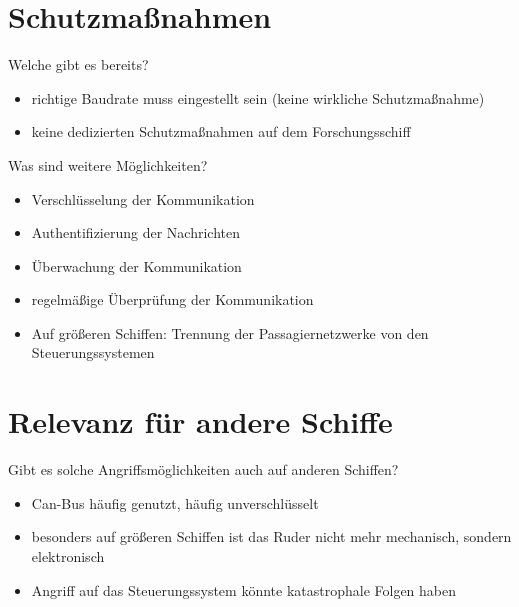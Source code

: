 \section{Schutzmaßnahmen}
Welche gibt es bereits?
\begin{itemize}
    \item richtige Baudrate muss eingestellt sein (keine wirkliche Schutzmaßnahme)
    \item keine dedizierten Schutzmaßnahmen auf dem Forschungsschiff
\end{itemize}
Was sind weitere Möglichkeiten?
\begin{itemize}
    \item Verschlüsselung der Kommunikation
    \item Authentifizierung der Nachrichten
    \item Überwachung der Kommunikation
    \item regelmäßige Überprüfung der Kommunikation
    \item Auf größeren Schiffen: Trennung der Passagiernetzwerke von den Steuerungssystemen
\end{itemize}

\section{Relevanz für andere Schiffe}
Gibt es solche Angriffsmöglichkeiten auch auf anderen Schiffen?
\begin{itemize}
    \item Can-Bus häufig genutzt, häufig unverschlüsselt
    \item besonders auf größeren Schiffen ist das Ruder nicht mehr mechanisch, sondern elektronisch
    \item Angriff auf das Steuerungssystem könnte katastrophale Folgen haben
\end{itemize}